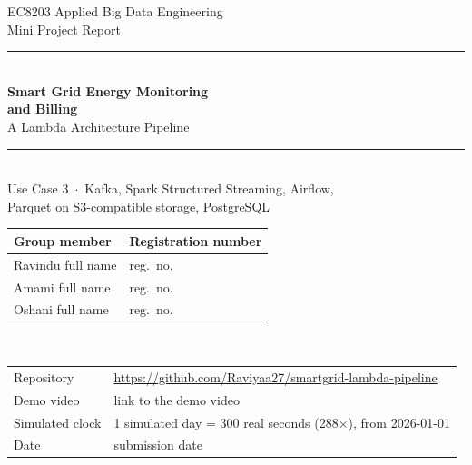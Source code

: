 \documentclass[11pt,a4paper]{article}
\newcommand{\fillin}[1]{\colorbox{orange!15}{\small #1}}
\newcommand{\nameRavindu}{Ravindu \fillin{full name}}
\newcommand{\regRavindu}{\fillin{reg.\ no.}}
\newcommand{\nameAmami}{Amami \fillin{full name}}
\newcommand{\regAmami}{\fillin{reg.\ no.}}
\newcommand{\nameOshani}{Oshani \fillin{full name}}
\newcommand{\regOshani}{\fillin{reg.\ no.}}
\newcommand{\submissiondate}{\fillin{submission date}}
\newcommand{\videolink}{\fillin{link to the demo video}}
\begin{document}
\begin{titlepage}
  \thispagestyle{empty}
  \vspace*{0.3cm}
  {\color{muted}\large EC8203 Applied Big Data Engineering\\[2pt] Mini Project Report}\\[1.0cm]
  {\color{accent}\rule{\linewidth}{1.2pt}}\\[0.5cm]
  {\Huge\bfseries\color{ink} Smart Grid Energy Monitoring\\[4pt] and Billing}\\[0.4cm]
  {\LARGE\color{accent} A Lambda Architecture Pipeline}\\[0.3cm]
  {\color{accent}\rule{\linewidth}{1.2pt}}\\[0.8cm]
  {\large Use Case 3 \,$\cdot$\, Kafka, Spark Structured Streaming, Airflow,\\[2pt]
   Parquet on S3-compatible storage, PostgreSQL}\\[1.1cm]

  \begin{tabular}{@{}ll@{}}
    \toprule
    \textbf{Group member} & \textbf{Registration number} \\
    \midrule
    \nameRavindu & \regRavindu \\
    \nameAmami   & \regAmami \\
    \nameOshani  & \regOshani \\
    \bottomrule
  \end{tabular}\\[0.9cm]

  \begin{tabular}{@{}ll@{}}
    Repository & \url{https://github.com/Raviyaa27/smartgrid-lambda-pipeline} \\
    Demo video & \videolink \\
    Simulated clock & 1 simulated day = 300 real seconds (288$\times$), from 2026-01-01 \\
    Date & \submissiondate
  \end{tabular}\\[1.1cm]


\end{titlepage}
\end{document}
